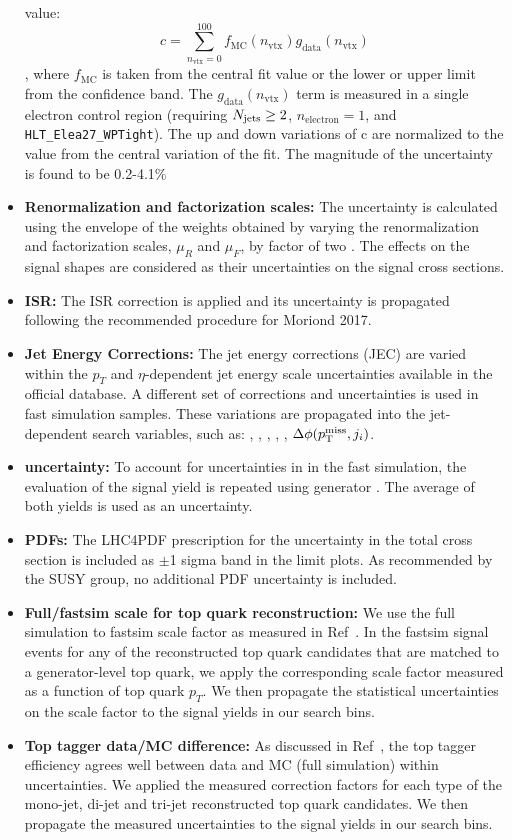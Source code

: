 \begin{itemize}
value:
\begin{equation}
c = \sum_{n_{\text{vtx}}=0}^{100} f_{\text{MC}}(n_{\text{vtx}})g_{\text{data}}(n_{\text{vtx}}) \label{eq:puacc-expval}
\end{equation}
, where $f_{\text{MC}}$ is taken from the central fit value or the lower or upper limit from the confidence band.
The $g_{\text{data}}(n_{\text{vtx}})$ term is measured in a single electron control region (requiring $N_{\text{jets}}\geq2$, $n_{\text{electron}}=1$, and \texttt{HLT\_Elea27\_WPTight}).
The up and down variations of c are normalized to the value from the central variation of the fit. The magnitude of the uncertainty is found to be 0.2-4.1\%
\item {\bf Renormalization and factorization scales:} The uncertainty is calculated using the envelope of the weights obtained by varying the renormalization and factorization scales, $\mu_{R}$ and $\mu_{F}$, by factor of two \cite{Cacciari:2003fi,Catani:2003zt}. The effects on the signal shapes are considered as their uncertainties on the signal cross sections. %
\item {\bf ISR:} The ISR correction is applied and its uncertainty is propagated following the recommended procedure for Moriond 2017.
\item {\bf Jet Energy Corrections:} The jet energy corrections (JEC) are varied within the $p_{T}$ and $\eta$-dependent jet energy scale uncertainties available in the official database. A different set of corrections and uncertainties is used in fast simulation samples. These variations are propagated into the jet-dependent search variables, such as: \nbjets, \ntops, \MET, \MTTwo, \HT, $\Delta\phi(p^{\rm miss}_{\rm T},j_{i})$.
\item {\bf \MET uncertainty:} To account for uncertainties in \MET in the fast simulation, the evaluation of the signal yield is repeated using generator \MET. The average of both yields is used as an uncertainty.
\item {\bf PDFs:} The LHC4PDF\cite{Butterworth:2015oua} prescription for the uncertainty in the total cross section is included as $\pm$1 sigma band in the limit plots. As recommended by the SUSY group, no additional PDF uncertainty is included.
\item {\bf Full/fastsim scale for top quark reconstruction:} We use the full simulation to fastsim scale factor as measured in Ref~\cite{AN-16-461}. In the fastsim signal events for any of the reconstructed top quark candidates that are matched to a generator-level top quark, we apply the corresponding scale factor measured as a function of top quark $p_{T}$. We then propagate the statistical uncertainties on the scale factor to the signal yields in our search bins.
\item {\bf Top tagger data/MC difference:} As discussed in Ref~\cite{AN-16-461}, the top tagger efficiency agrees well between data and MC (full simulation) within uncertainties. We applied the measured correction factors for each type of the mono-jet, di-jet and tri-jet reconstructed top quark candidates. We then propagate the measured uncertainties to the signal yields in our search bins.
\end{itemize}

